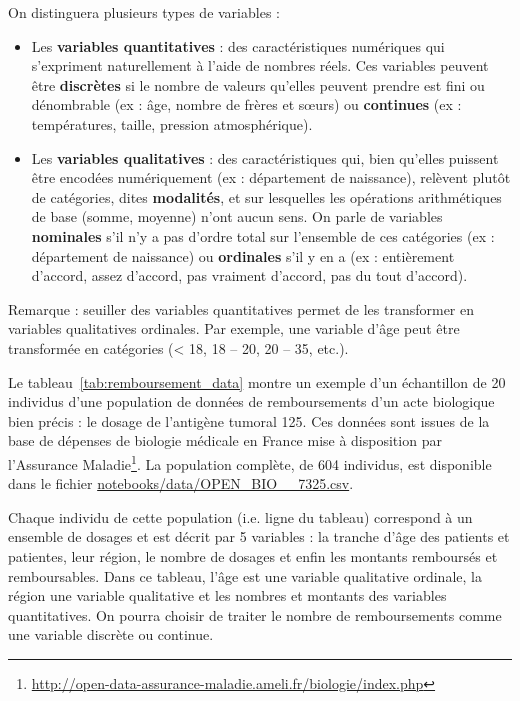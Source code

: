 On distinguera plusieurs types de variables :
\begin{itemize}
	\item Les \textbf{variables quantitatives} : des caractéristiques numériques
	qui s'expriment naturellement à l'aide de nombres réels. Ces variables
	peuvent être \textbf{discrètes} si le nombre de valeurs qu'elles peuvent
	prendre est fini ou dénombrable (ex : âge, nombre de frères et s\oe{}urs) ou
	\textbf{continues} (ex : températures, taille, pression atmosphérique).
	\item Les \textbf{variables qualitatives} : des caractéristiques qui, bien
	qu'elles puissent être encodées numériquement (ex : département de
	naissance), relèvent plutôt de catégories, dites \textbf{modalités}, et sur lesquelles les opérations
	arithmétiques de base (somme, moyenne) n'ont aucun sens. On parle de
	variables \textbf{nominales} s'il n'y a pas d'ordre total sur l'ensemble de
	ces catégories (ex : département de naissance) ou \textbf{ordinales} s'il y
	en a (ex : entièrement d'accord, assez d'accord, pas vraiment d'accord, pas
	du tout d'accord).
\end{itemize}

Remarque : seuiller des variables quantitatives permet de les transformer en
variables qualitatives ordinales. Par exemple, une variable d'âge peut être
transformée en catégories (< 18, 18 -- 20, 20 -- 35, etc.).

Le tableau~\ref{tab:remboursement_data} montre un exemple d'un échantillon de
20 individus d'une population de données de remboursements d'un acte biologique
bien précis : le dosage de l'antigène tumoral 125. Ces données sont issues de
la base de dépenses de biologie médicale en France mise à disposition par
l'Assurance
Maladie\footnote{\url{http://open-data-assurance-maladie.ameli.fr/biologie/index.php}}. La
population complète, de 604 individus, est disponible dans le fichier \href{https://github.com/chagaz/sdd_2025/blob/main/poly/notebooks/data/OPEN_BIO_2018_7325.csv}{\ttfamily notebooks/\allowbreak data/\allowbreak OPEN\_\allowbreak BIO\_\_\allowbreak 7325.csv}.

Chaque individu de cette population (i.e. ligne du tableau) correspond à un
ensemble de dosages et est décrit par 5 variables : la tranche d'âge des
patients et patientes, leur région, le nombre de dosages et enfin les
montants remboursés et remboursables. Dans ce tableau, l'âge est une variable
qualitative ordinale, la région une variable qualitative et les nombres et
montants des variables quantitatives. On pourra choisir de traiter le nombre de
remboursements comme une variable discrète ou continue.


